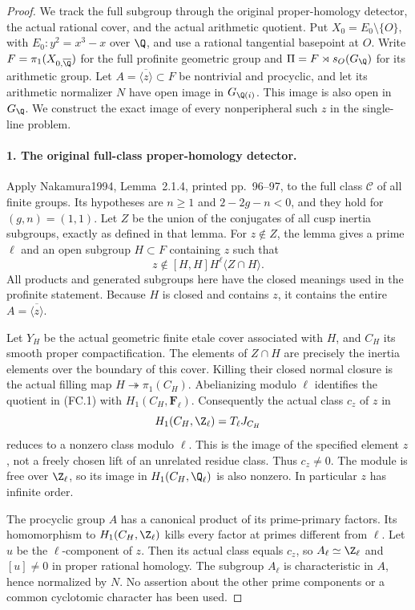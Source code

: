 \begin{proof}
We track the full subgroup through the original proper-homology detector, the actual rational cover, and the actual arithmetic quotient.
Put $X_0=E_0\setminus\{O\}$, with
$E_0:y^2=x^3-x$ over $\Q$, and use a rational tangential
basepoint at $O$. Write $F=\pi_1(X_{0,\overline\Q})$ for
the full profinite geometric group and
$\Pi=F\rtimes s_O(G_\Q)$ for its arithmetic group.
Let $A=\overline{\langle z\rangle}\subset F$ be nontrivial
and procyclic, and let its arithmetic normalizer $N$
have open image in $G_{\Q(i)}$. This image is also open
in $G_\Q$. We construct the exact image of every
nonperipheral such $z$ in the single-line problem.

\paragraph{1. The original full-class proper-homology detector.}
Apply Nakamura1994, Lemma~2.1.4, printed pp.~96--97,
to the full class $\mathcal C$ of all finite groups\cite{AuditNakamura1994}.
Its hypotheses are $n\geq1$ and $2-2g-n<0$, and they
hold for $(g,n)=(1,1)$. Let $Z$ be the union of the
conjugates of all cusp inertia subgroups, exactly as
defined in that lemma. For $z\notin Z$, the lemma gives
a prime $\ell$ and an open subgroup $H\subset F$
containing $z$ such that
\[
             z\notin [H,H]H^\ell\langle Z\cap H\rangle .    \tag{FC.1}
\]
All products and generated subgroups here have the
closed meanings used in the profinite statement.
Because $H$ is closed and contains $z$, it contains
the entire $A=\overline{\langle z\rangle}$.

Let $Y_H$ be the actual geometric finite etale cover
associated with $H$, and $C_H$ its smooth proper
compactification. The elements of $Z\cap H$ are
precisely the inertia elements over the boundary
of this cover. Killing their closed normal closure
is the actual filling map
$H\twoheadrightarrow\pi_1(C_H)$. Abelianizing modulo
$\ell$ identifies the quotient in (FC.1) with
$H_1(C_H,\mathbf F_\ell)$. Consequently the actual
class $c_z$ of $z$ in
\[
                    H_1(C_H,\Z_\ell)=T_\ell J_{C_H}
\]
reduces to a nonzero class modulo $\ell$.
This is the image of the specified element $z$,
not a freely chosen lift of an unrelated residue
class. Thus $c_z\ne0$. The module is free over
$\Z_\ell$, so its image in
$H_1(C_H,\Q_\ell)$ is also nonzero.
In particular $z$ has infinite order.

The procyclic group $A$ has a canonical product of
its prime-primary factors. Its homomorphism to
$H_1(C_H,\Z_\ell)$ kills every factor at primes
different from $\ell$. Let $u$ be the $\ell$-component
of $z$. Then its actual class equals $c_z$, so
$A_\ell\simeq\Z_\ell$ and $[u]\ne0$ in proper
rational homology. The subgroup $A_\ell$ is
characteristic in $A$, hence normalized by $N$.
No assertion about the other prime components
or a common cyclotomic character has been used.


\end{proof}
